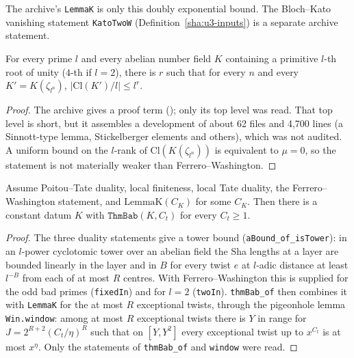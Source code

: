 \begin{remark}\label{sha:rem-lemmak}
The archive's \texttt{LemmaK} is only this doubly exponential bound. The Bloch--Kato
vanishing statement \texttt{KatoTwoW} (Definition~\ref{sha:u3-inputs}) is a separate
archive statement.
\end{remark}

\begin{lemma}\label{sha:fw}
For every prime $l$ and every abelian number field $K$ containing a primitive $l$-th root of
unity ($4$-th if $l=2$), there is $r$ such that for every $n$ and every
$K'=K(\zeta_{l^n})$, $|\mathrm{Cl}(K')/l|\le l^r$.
\end{lemma}
\begin{proof}
The archive gives a proof term (); only its top level was read. That top level is short, but it assembles a development of about 62 files and 4{,}700 lines (a Sinnott-type lemma, Stickelberger elements and others), which was not audited. A uniform bound on the $l$-rank of $\mathrm{Cl}(K(\zeta_{l^n}))$ is equivalent to $\mu=0$, so the statement is not materially weaker than Ferrero--Washington.
\end{proof}

\begin{theorem}\label{sha:thmbab-of}
Assume Poitou--Tate duality, local finiteness, local Tate duality, the Ferrero--Washington
statement, and $\mathrm{LemmaK}(C_K)$ for some $C_K$. Then there is a constant datum $K$ with
$\texttt{ThmBab}(K,C_t)$ for every $C_t\ge1$.
\end{theorem}
\begin{proof}
The three duality statements give a tower bound (\texttt{aBound\_of\_isTower}): in an
$l$-power cyclotomic tower over an abelian field the Sha lengths at a layer are bounded
linearly in the layer and in $B$ for every twist $e$ at $l$-adic distance at least $l^{-B}$
from each of at most $R$ centres. With Ferrero--Washington this is supplied for the odd bad
primes (\texttt{fixedIn}) and for $l=2$ (\texttt{twoIn}). \texttt{thmBab\_of} then combines it
with \texttt{LemmaK} for the at most $R$ exceptional twists, through the pigeonhole lemma
\texttt{Win.window}: among at most $R$ exceptional twists there is $Y$ in range for
$J=2^{R+2}(C_t/\eta)^R$ such that on $[Y,Y^2]$ every exceptional twist up to $x^{C_t}$ is at
most $x^{\eta}$. Only the statements of \texttt{thmBab\_of} and \texttt{window} were read.
\end{proof}

